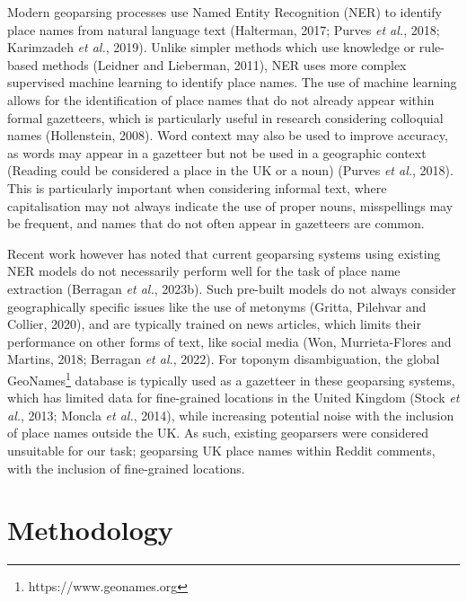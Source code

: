 \documentclass[
  letterpaper,
  11pt,
  english,
  onehalfspacing,
  headsepline]{MastersDoctoralThesis}
\begin{document}
Modern geoparsing processes use Named Entity Recognition (NER) to
identify place names from natural language text (Halterman, 2017; Purves
\emph{et al.}, 2018; Karimzadeh \emph{et al.}, 2019). Unlike simpler
methods which use knowledge or rule-based methods (Leidner and
Lieberman, 2011), NER uses more complex supervised machine learning to
identify place names. The use of machine learning allows for the
identification of place names that do not already appear within formal
gazetteers, which is particularly useful in research considering
colloquial names (Hollenstein, 2008). Word context may also be used to
improve accuracy, as words may appear in a gazetteer but not be used in
a geographic context (Reading could be considered a place in the UK or a
noun) (Purves \emph{et al.}, 2018). This is particularly important when
considering informal text, where capitalisation may not always indicate
the use of proper nouns, misspellings may be frequent, and names that do
not often appear in gazetteers are common.

Recent work however has noted that current geoparsing systems using
existing NER models do not necessarily perform well for the task of
place name extraction (Berragan \emph{et al.}, 2023b). Such pre-built
models do not always consider geographically specific issues like the
use of metonyms (Gritta, Pilehvar and Collier, 2020), and are typically
trained on news articles, which limits their performance on other forms
of text, like social media (Won, Murrieta-Flores and Martins, 2018;
Berragan \emph{et al.}, 2022). For toponym disambiguation, the global
GeoNames\footnote{https://www.geonames.org} database is typically used
as a gazetteer in these geoparsing systems, which has limited data for
fine-grained locations in the United Kingdom (Stock \emph{et al.}, 2013;
Moncla \emph{et al.}, 2014), while increasing potential noise with the
inclusion of place names outside the UK. As such, existing geoparsers
were considered unsuitable for our task; geoparsing UK place names
within Reddit comments, with the inclusion of fine-grained locations.

\hypertarget{sec-methodologycon}{%
\section{Methodology}\label{sec-methodologycon}}
\end{document}
